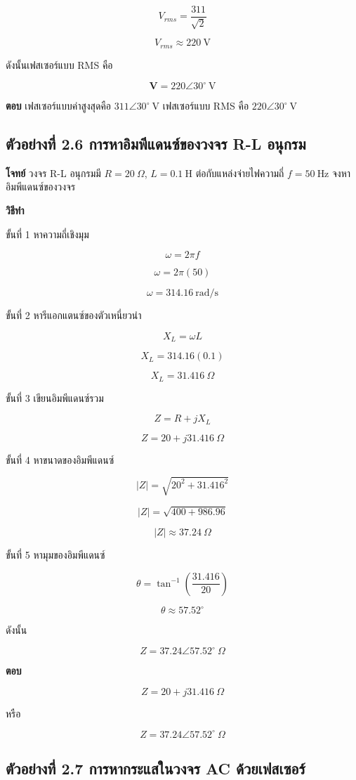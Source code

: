 \[
V_{rms}=\frac{311}{\sqrt{2}}
\]

\[
V_{rms}\approx 220\ \text{V}
\]

ดังนั้นเฟสเซอร์แบบ RMS คือ

\[
\mathbf{V}=220\angle30^\circ\ \text{V}
\]

\textbf{ตอบ}  
เฟสเซอร์แบบค่าสูงสุดคือ $311\angle30^\circ\ \text{V}$  
เฟสเซอร์แบบ RMS คือ $220\angle30^\circ\ \text{V}$

\subsection*{ตัวอย่างที่ 2.6 การหาอิมพีแดนซ์ของวงจร R-L อนุกรม}

\textbf{โจทย์}  
วงจร R-L อนุกรมมี $R=20\ \Omega$, $L=0.1\ \text{H}$ ต่อกับแหล่งจ่ายไฟความถี่ $f=50\ \text{Hz}$ จงหาอิมพีแดนซ์ของวงจร

\textbf{วิธีทำ}

ขั้นที่ 1 หาความถี่เชิงมุม

\[
\omega=2\pi f
\]

\[
\omega=2\pi(50)
\]

\[
\omega=314.16\ \text{rad/s}
\]

ขั้นที่ 2 หารีแอกแตนซ์ของตัวเหนี่ยวนำ

\[
X_L=\omega L
\]

\[
X_L=314.16(0.1)
\]

\[
X_L=31.416\ \Omega
\]

ขั้นที่ 3 เขียนอิมพีแดนซ์รวม

\[
Z=R+jX_L
\]

\[
Z=20+j31.416\ \Omega
\]

ขั้นที่ 4 หาขนาดของอิมพีแดนซ์

\[
|Z|=\sqrt{20^2+31.416^2}
\]

\[
|Z|=\sqrt{400+986.96}
\]

\[
|Z|\approx 37.24\ \Omega
\]

ขั้นที่ 5 หามุมของอิมพีแดนซ์

\[
\theta=\tan^{-1}\left(\frac{31.416}{20}\right)
\]

\[
\theta\approx 57.52^\circ
\]

ดังนั้น

\[
Z=37.24\angle57.52^\circ\ \Omega
\]

\textbf{ตอบ}

\[
Z=20+j31.416\ \Omega
\]

หรือ

\[
Z=37.24\angle57.52^\circ\ \Omega
\]

\subsection*{ตัวอย่างที่ 2.7 การหากระแสในวงจร AC ด้วยเฟสเซอร์}

